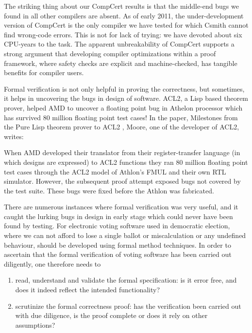 	\begin{displayquote}
	
	The striking thing about our CompCert results is that the middle-end 
	bugs we found in all other compilers are absent. As of early 2011,
	the under-development version of CompCert is the only compiler we
	have tested for which Csmith cannot find wrong-code errors. This is
	not for lack of trying: we have devoted about six CPU-years to the
	task. The apparent unbreakability of CompCert supports a strong
	argument that developing compiler optimizations within a proof
	framework, where safety checks are explicit and machine-checked,
	has tangible benefits for compiler users.
	
	\end{displayquote}
	
	\noindent
	Formal verification is not only helpful in proving the correctness, 
	but sometimes, it helps in uncovering the bugs in design of
	software. ACL2, a Lisp based theorem prover, helped 
	AMD to uncover a floating point bug in Athelon processor which 
	has survived 80 million floating point test cases! 
	In the paper, Milestones from the Pure Lisp theorem prover to ACL2
	\citep{Moore2019}, Moore, one of the developer of ACL2, writes:
	
	\begin{displayquote}
	
	When AMD developed their translator 
	from their register-transfer language (in which designs
	are expressed) to ACL2 functions they ran 80 million 
	floating point test cases through the ACL2 model of 
	Athlon’s FMUL and their own RTL simulator. However, the 
	subsequent proof attempt exposed bugs not covered by the
	test suite. These bugs were fixed before the Athlon was 
	fabricated.
	
	\end{displayquote}
  
   
   There are numerous instances where formal verification 
	was very useful, and it caught the lurking bugs in design in early 
	stage which could never have been found by testing.
	For electronic voting software used in democratic election, where we 
	can not afford to lose a single ballot or miscalculation 
	or any undefined behaviour, should be developed 
	using formal method techniques.
	In order to ascertain that the formal verification of voting software has been 
	carried out diligently, one therefore needs to
	\begin{enumerate}
	\item read, understand and validate the formal specification: is it 
	error free, and does it indeed reflect the intended functionality?
	\item scrutinize the formal correctness proof: has the verification
	been carried out with due diligence, is the proof complete or does
	it rely on other assumptions?

	\end{enumerate}			
	
